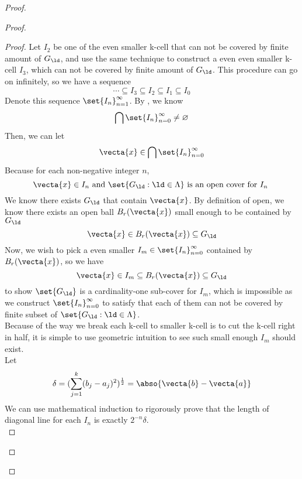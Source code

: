 \documentclass{report}
\begin{document}
\begin{proof}
\begin{proof}
\begin{proof}
Let $I_2$ be one of the even smaller k-cell that can not be covered by finite amount of  $G_\ld $, and use the same technique to construct a even even smaller k-cell $I_3$, which can not be covered by finite amount of $G_\ld $. This procedure can go on infinitely, so we have a sequence
\begin{equation*}
\cdots \subseteq I_3 \subseteq I_2\subseteq I_1\subseteq I_0
\end{equation*}
Denote this sequence $\set{I_n}_{n=1}^\infty$. By , we know 
\begin{equation*}
\bigcap \set{I_n}_{n=0}^\infty \neq \varnothing
\end{equation*}
Then, we can let
\begin{equation*}
\vecta{x}\in \bigcap \set{I_n}_{n=0}^\infty
\end{equation*}
Because for each non-negative integer $n$, 
\begin{equation*}
\vecta{x}\in I_n\text{ and }\set{G_\ld :\ld \in\Lambda }\text{ is an open cover for $I_n$ }
\end{equation*}
We know there exists $G_\ld $ that contain $\vecta{x}$. By definition of open, we know there exists an open ball $B_r(\vecta{x})$ small enough to be contained by $G_\ld $
\begin{equation*}
\vecta{x}\in B_r(\vecta{x})\subseteq G_\ld 
\end{equation*}
Now, we wish to pick a even smaller $I_m \in \set{I_n}_{n=0}^\infty$ contained by $B_r(\vecta{x})$, so we have
\begin{equation*}
\vecta{x}\in I_m \subseteq B_r(\vecta{x})\subseteq G_\ld 
\end{equation*}
to show $\set{G_\ld }$ is a cardinality-one sub-cover for $I_m$, which is impossible as we construct $\set{I_n}_{n=0}^\infty$ to satisfy that each of them can not be covered by finite subset of $\set{G_\ld :\ld \in \Lambda }$.\\

Because of the way we break each k-cell to smaller k-cell is to cut the k-cell right in half, it is simple to use geometric intuition to see such small enough $I_m$ should exist.\\

Let
\begin{equation*}
\delta=(\sum_{j=1}^k (b_j-a_j)^2)^{\frac{1}{2}}=\abso{\vecta{b}-\vecta{a}}
\end{equation*}
We can use mathematical induction to rigorously prove that the length of diagonal line for each $I_n$ is exactly $2^{-n}\delta$.\\


\end{proof}
\end{proof}
\end{proof}
\end{document}
